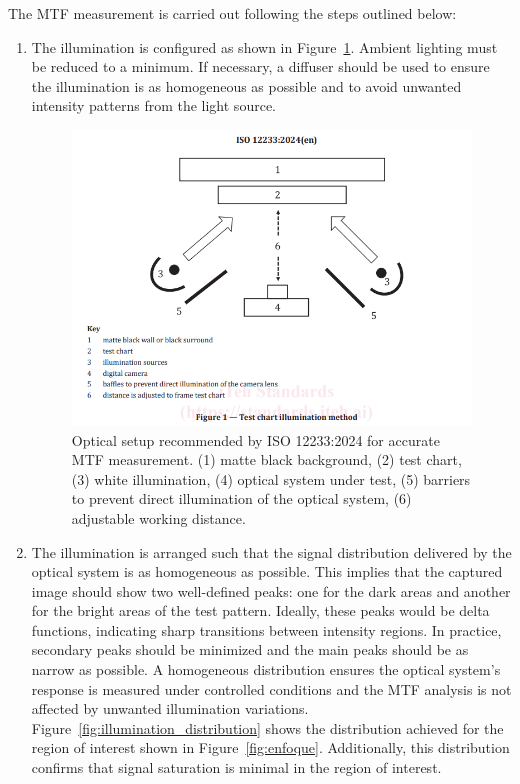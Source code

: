 The MTF measurement is carried out following the steps outlined below:

\begin{enumerate}
    \item The illumination is configured as shown in Figure~\ref{fig:srf_motaje}. Ambient lighting must be reduced to a minimum. If necessary, a diffuser should be used to ensure the illumination is as homogeneous as possible and to avoid unwanted intensity patterns from the light source.
    
    \begin{figure}[H]
        \centering
        \includegraphics[trim=20mm 50mm 20mm 0mm, clip, width=0.7\linewidth]{Figures/C3/iso 12233 montaje.png}
        \caption{Optical setup recommended by ISO 12233:2024 for accurate MTF measurement. (1) matte black background, (2) test chart, (3) white illumination, (4) optical system under test, (5) barriers to prevent direct illumination of the optical system, (6) adjustable working distance.}
        \label{fig:srf_motaje}
    \end{figure}

    \item The illumination is arranged such that the signal distribution delivered by the optical system is as homogeneous as possible. This implies that the captured image should show two well-defined peaks: one for the dark areas and another for the bright areas of the test pattern. Ideally, these peaks would be delta functions, indicating sharp transitions between intensity regions. In practice, secondary peaks should be minimized and the main peaks should be as narrow as possible. A homogeneous distribution ensures the optical system’s response is measured under controlled conditions and the MTF analysis is not affected by unwanted illumination variations. Figure~\ref{fig:illumination_distribution} shows the distribution achieved for the region of interest shown in Figure~\ref{fig:enfoque}. Additionally, this distribution confirms that signal saturation is minimal in the region of interest.


\end{enumerate}
